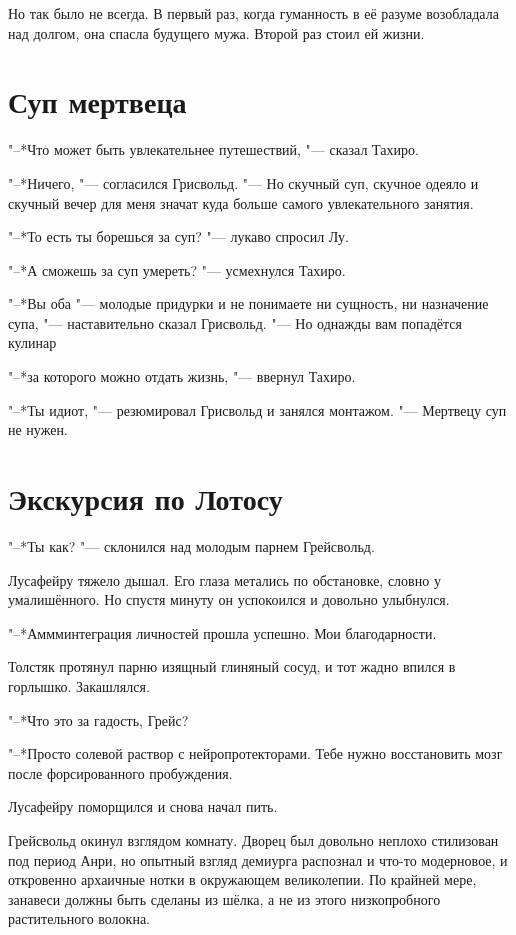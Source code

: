 Но так было не всегда.
В первый раз, когда гуманность в её разуме возобладала над долгом, она спасла будущего мужа.
Второй раз стоил ей жизни.

\section{Суп мертвеца}

"--*Что может быть увлекательнее путешествий, "--- сказал Тахиро.

"--*Ничего, "--- согласился Грисвольд.
"--- Но скучный суп, скучное одеяло и скучный вечер для меня значат куда больше самого увлекательного занятия.

"--*То есть ты борешься за суп? "--- лукаво спросил Лу.

"--*А сможешь за суп умереть? "--- усмехнулся Тахиро.

"--*Вы оба "--- молодые придурки и не понимаете ни сущность, ни назначение супа, "--- наставительно сказал Грисвольд.
"--- Но однажды вам попадётся кулинар\ldotst

"--*\ldotst за которого можно отдать жизнь, "--- ввернул Тахиро.

"--*Ты идиот, "--- резюмировал Грисвольд и занялся монтажом.
"--- Мертвецу суп не нужен.

\section{Экскурсия по Лотосу}

"--*Ты как? "--- склонился над молодым парнем Грейсвольд.

Лусафейру тяжело дышал.
Его глаза метались по обстановке, словно у умалишённого. Но спустя минуту он успокоился и довольно улыбнулся.

"--*Аммм\ldotst интеграция личностей прошла успешно.
Мои благодарности.

Толстяк протянул парню изящный глиняный сосуд, и тот жадно впился в горлышко.
Закашлялся.

"--*Что это за гадость, Грейс?

"--*Просто солевой раствор с нейропротекторами.
Тебе нужно восстановить мозг после форсированного пробуждения.

Лусафейру поморщился и снова начал пить.

Грейсвольд окинул взглядом комнату.
Дворец был довольно неплохо стилизован под период Анри, но опытный взгляд демиурга распознал и что-то модерновое, и откровенно архаичные нотки в окружающем великолепии.
По крайней мере, занавеси должны быть сделаны из шёлка, а не из этого низкопробного растительного волокна.

